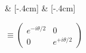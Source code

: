 \begin{quantikz}[row sep={0.6cm,between origins}, wire types={q}]
	 & [-.4cm]  & [-.4cm] \\
\end{quantikz} $ \equiv \begin{pmatrix}
		e^{-i\theta/2} & 0              \\[.3cm]
		0              & e^{+i\theta/2}
	\end{pmatrix} $